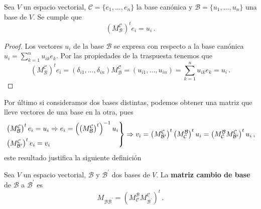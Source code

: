 \begin{prop}
  Sea $V$ un espacio vectorial, $\mathcal{C}=\{e_1,\dots,e_n\}$ la base canónica y $\mathcal{B}=\{u_1,\dots,u_n\}$ una base de $V$. Se cumple que
  \[
    \left(M_{\mathcal{B}}^{\mathcal{C}}\right)^t e_i = u_i\,.
  \]
\end{prop}
\begin{proof}
  Los vectores $u_i$ de la base $\mathcal{B}$ se expresa con respecto a la base canónica $u_i = \sum_{k=1}^n u_{ik}e_k$.
  Por las propiedades de la traspuesta tenemos que
  \[
    \left(M_{\mathcal{B}}^{\mathcal{C}}\right)^t e_i = (\delta_{i1}, \dots, \delta_{in}) M_{\mathcal{B}}^{\mathcal{C}} = (u_{i1},\dots,u_{in}) = \sum_{k=1}^n u_{ik} e_k = u_i\,.
  \]
\end{proof}

Por último si consideramos dos bases distintas, podemos obtener una matriz que lleve vectores de una base en la otra, pues
\[
  \begin{rcases}
    \left(M_{\mathcal{B}}^{\mathcal{C}}\right)^t e_i = u_i \Rightarrow  e_i = \left(\left(M_{\mathcal{B}}^{\mathcal{C}}\right)^t\right)^{-1} u_i \\
    \left(M_{\mathcal{B^\prime}}^{\mathcal{C}}\right)^t e_i = v_i
  \end{rcases}\Rightarrow v_i = \left(M_{\mathcal{B^\prime}}^{\mathcal{C}}\right)^t \left(M_{\mathcal{C}}^{\mathcal{B}}\right)^t u_i = \left(M_{\mathcal{C}}^{\mathcal{B}} M_{\mathcal{B^\prime}}^{\mathcal{C}}\right)^t u_i\,,
\]
este resultado justifica la siguiente definición

\begin{defi}
  Sea $V$ un espacio vectorial, $\mathcal{B}$ y $\mathcal{B^\prime}$ dos bases de $V$. La \textbf{matriz cambio de base} de $\mathcal{B}$ a $\mathcal{B}^\prime$ es
  \[
    M_{\mathcal{B}\mathcal{B^\prime}} = \left(M_{\mathcal{C}}^{\mathcal{B}} M_{\mathcal{B^\prime}}^{\mathcal{C}}\right)^t\,.
  \]
\end{defi}

